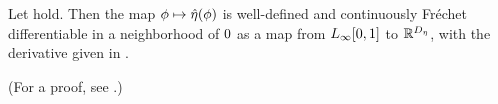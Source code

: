 \begin{thm}
%
Let  hold. Then the map $\phi \mapsto
\hat\eta(\phi)$ is well-defined and continuously Fr{\'e}chet differentiable in a
neighborhood of $0$ as a map from ${L_{\infty}[0,1]}$ to $\mathbb{R}^{D_{\eta}}$,
with the derivative given in .

(For a proof, see  .)
%

\end{thm}
%
